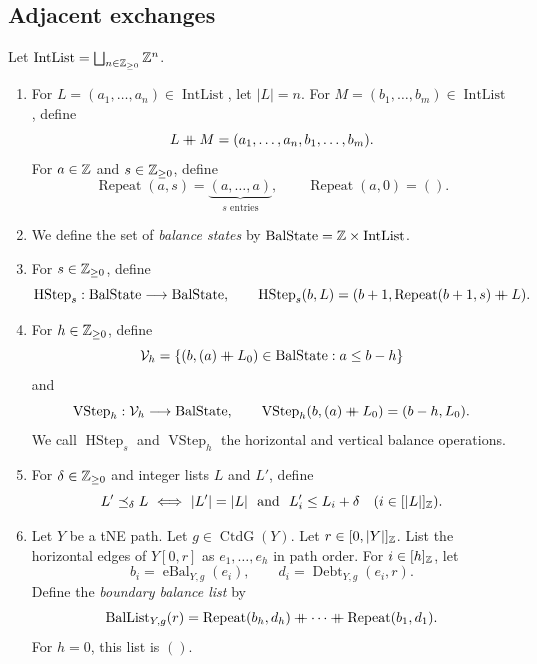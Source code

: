 \subsection{Adjacent exchanges}
\begin{definition}\label{def:balance-operations}
Let $\operatorname{IntList}=\bigsqcup_{n\in\mathbb Z_{\ge0}}\mathbb Z^n$.
\begin{enumerate}[font=\itshape]
\item For $L=(a_1,\ldots,a_n)\in\operatorname{IntList}$, let $|L|=n$.
For $M=(b_1,\ldots,b_m)\in\operatorname{IntList}$, define
\[
 L\mathbin{+\mkern-10mu+} M=(a_1,\ldots,a_n,b_1,\ldots,b_m).
\]
For $a\in\mathbb Z$ and $s\in\mathbb Z_{\ge0}$, define
\[
 \operatorname{Repeat}(a,s)=\underbrace{(a,\ldots,a)}_{s\text{ entries}},\qquad
 \operatorname{Repeat}(a,0)=().
\]
\item We define the set of \textit{balance states} by
$\operatorname{BalState}=\mathbb Z\times\operatorname{IntList}$.
\item\label{d:horizontal-balance-step} For $s\in\mathbb Z_{\ge0}$, define
\[
 \operatorname{HStep}_s:\operatorname{BalState}\longrightarrow\operatorname{BalState},\qquad
 \operatorname{HStep}_s(b,L)=(b+1,\operatorname{Repeat}(b+1,s)\mathbin{+\mkern-10mu+} L).
\]
\item\label{d:vertical-balance-step} For $h\in\mathbb Z_{\ge0}$, define
\[
 \mathcal V_h=\{(b,(a)\mathbin{+\mkern-10mu+} L_0)\in\operatorname{BalState}:a\le b-h\}
\]
and
\[
 \operatorname{VStep}_h:\mathcal V_h\longrightarrow\operatorname{BalState},\qquad
 \operatorname{VStep}_h(b,(a)\mathbin{+\mkern-10mu+} L_0)=(b-h,L_0).
\]
We call $\operatorname{HStep}_s$ and $\operatorname{VStep}_h$ the horizontal and vertical balance operations.
\item\label{d:balance-list-order} For $\delta\in\mathbb Z_{\ge0}$ and integer lists $L$ and $L'$, define
\begin{equation}\label{eq:exchange-list-comparison}
 L'\preceq_\delta L
 \ \Longleftrightarrow\
 |L'|=|L|\ \text{ and }\ L'_i\le L_i+\delta\quad(i\in[|L|]_{\mathbb Z}).
\end{equation}
\item\label{d:boundary-balance-list} Let $Y$ be a tNE path. Let $g\in\operatorname{CtdG}(Y)$. Let $r\in[0,|Y|]_{\mathbb Z}$.
List the horizontal edges of $Y[0,r]$ as $e_1,\ldots,e_h$ in path order.
For $i\in[h]_{\mathbb Z}$, let
\[
 b_i=\operatorname{eBal}_{Y,g}(e_i),\qquad
 d_i=\operatorname{Debt}_{Y,g}(e_i,r).
\]
Define the \textit{boundary balance list} by
\[
 \operatorname{BalList}_{Y,g}(r)
 =\operatorname{Repeat}(b_h,d_h)\mathbin{+\mkern-10mu+}\cdots\mathbin{+\mkern-10mu+}\operatorname{Repeat}(b_1,d_1).
\]
For $h=0$, this list is $()$.
\end{enumerate}
\end{definition}

